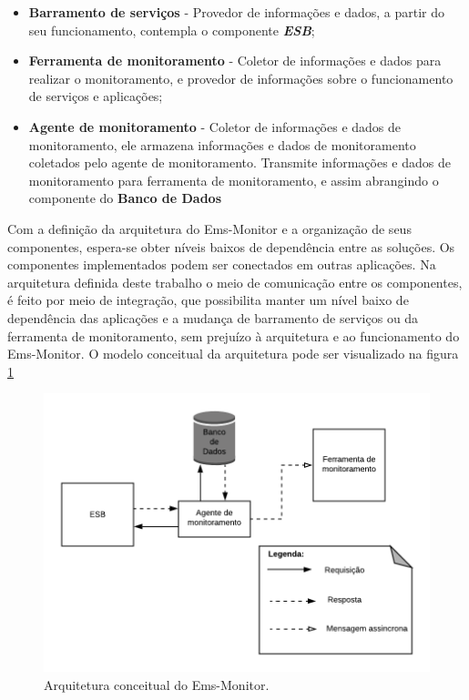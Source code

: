 \begin{itemize}
    \item \textbf{Barramento de serviços} - Provedor de informações e dados, a partir do seu funcionamento, contempla o componente \textbf{\textit{\acrshort{ESB}}}; 
    \item \textbf{Ferramenta de monitoramento} - Coletor de informações e dados para realizar o monitoramento, e provedor de informações sobre o funcionamento de serviços e aplicações; 
    \item \textbf{Agente de monitoramento} - Coletor de informações e dados de monitoramento, ele armazena informações e dados de monitoramento coletados pelo agente de monitoramento. Transmite informações e dados de monitoramento para ferramenta de monitoramento, e assim abrangindo o componente do \textbf{Banco de Dados}
\end{itemize}

Com a definição da arquitetura do Ems-Monitor e a organização de seus componentes, espera-se obter níveis baixos de dependência entre as soluções. Os componentes implementados podem ser conectados em outras aplicações. Na arquitetura definida deste trabalho o meio de comunicação entre os componentes, é feito por meio de integração, que possibilita manter um nível baixo de dependência das aplicações e a mudança de barramento de serviços ou da ferramenta de monitoramento, sem prejuízo à arquitetura e ao funcionamento do Ems-Monitor. O modelo conceitual da arquitetura pode ser visualizado na figura \ref{fun:fig:arquitetura_conceitual_monitoramento}

\begin{figure}[H]
	\begin{center}
	\includegraphics[scale = 0.90]{img/Arquitetura_Proposta_Monitoramento.png}
		\caption{Arquitetura conceitual do Ems-Monitor.}
		\label{fun:fig:arquitetura_conceitual_monitoramento}
	\end{center}
\end{figure}

